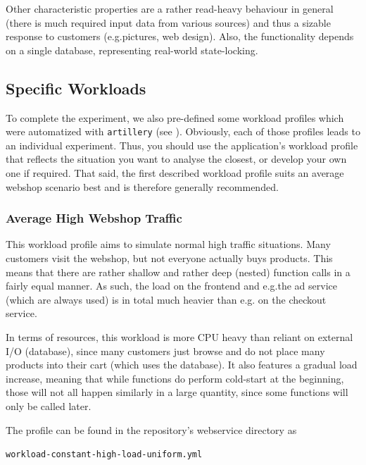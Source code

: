 \documentclass[../main.tex]{subfiles}
\begin{document}
Other characteristic properties are a rather read-heavy behaviour in general 
(there is much required input data from various sources) 
and thus a sizable response to customers (e.g.\@ pictures, web design). 
Also, the functionality depends on a single database, representing real-world state-locking.


\subsection{Specific Workloads}\label{ssec:webshopSpecificWorkloads}

To complete the experiment, we also pre-defined some workload profiles which were automatized with \texttt{artillery}
(see ).
Obviously, each of those profiles leads to an individual experiment.
Thus, you should use the application's workload profile that reflects the situation you want to analyse the closest,
or develop your own one if required.
That said, the first described workload profile suits an average webshop scenario best and is therefore generally recommended.

\subsubsection{Average High Webshop Traffic}%
\label{ssub:webshopProfileHighTraffic}

This workload profile aims to simulate normal high traffic situations.
Many customers visit the webshop, but not everyone actually buys products.
This means that there are rather shallow and rather deep (nested) function calls in a fairly equal manner.
As such, the load on the frontend and e.g.\@ the ad service (which are always used) is in total much heavier than e.g.\@ 
on the checkout service.

In terms of resources, this workload is more CPU heavy than reliant on external I/O (database),
since many customers just browse and do not place many products into their cart (which uses the database).
It also features a gradual load increase, meaning that while functions do perform cold-start at the beginning,
those will not all happen similarly in a large quantity, since some functions will only be called later.

The profile can be found in the repository's webservice directory as 
\begin{tcolorbox}
\quad\texttt{workload-constant-high-load-uniform.yml}
\end{tcolorbox}
\end{document}
